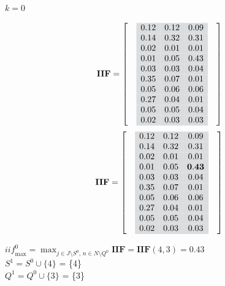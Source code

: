 \documentclass[aspectratio=149, compress]{beamer}
\begin{document}
\begin{frame}{$k=0$}
	
	\vspace*{-4mm}
	\begin{overprint}
		\small
		\begin{equation*}
			\mathbf{IIF} =
			\left[\begin{array}{c>{\columncolor{template!20}}c>{\columncolor{template!20}}c>{\columncolor{template!20}}cc}
				&0.12	  & 	0.12	  & 	0.09 & \\
				&0.14	  & 	0.32	  & 	0.31 &\\
				&0.02	  & 	0.01	  & 	0.01 &\\
				&0.01	  & 	0.05	  & 	0.43&\\
				&0.03	  & 	0.03	  & 	0.04&\\
				&0.35	  & 	0.07	  & 	0.01&\\
				&0.05	  & 	0.06	  & 	0.06&\\
				&0.27	  & 	0.04	  & 	0.01&\\
				&0.05	  & 	0.05	  & 	0.04&\\
				&0.02	  & 	0.03	  & 	0.03 &\\
			\end{array}\right]
		\end{equation*}
		\onslide<2->
		\small
		\begin{equation*}
			\mathbf{IIF} =
			\left[\begin{array}{c>{\columncolor{template!20}}c>{\columncolor{template!20}}c>{\columncolor{template!20}}cc}
				&0.12	  & 	0.12	  & 	0.09 & \\
				&0.14	  & 	0.32	  & 	0.31 &\\
				&0.02	  & 	0.01	  & 	0.01 &\\
				&0.01	  & 	0.05	  & 	\mathbf{0.43}&\\
				&0.03	  & 	0.03	  & 	0.04&\\
				&0.35	  & 	0.07	  & 	0.01&\\
				&0.05	  & 	0.06	  & 	0.06&\\
				&0.27	  & 	0.04	  & 	0.01&\\
				&0.05	  & 	0.05	  & 	0.04&\\
				&0.02	  & 	0.03	  & 	0.03 &\\
			\end{array}\right]
		\end{equation*}
	\end{overprint}
	
	\vspace{2mm}
	\small
	$\mathit{iif}_{\text{max}}^0=\displaystyle \max_{j \in J\setminus S^0, \, n  \in N \setminus Q^0} \mathbf{IIF}= \mathbf{IIF}(4,3) = 0.43$\\
	\onslide<2-> \vspace{1.5mm}
	$S^{1} = S^0 \cup \{4\}$ = \{4\}\\ \vspace{1.5mm}
	$Q^{1} = Q^0 \cup \{3\}$ = \{3\}\\ 
	
\end{frame}
\end{document}
